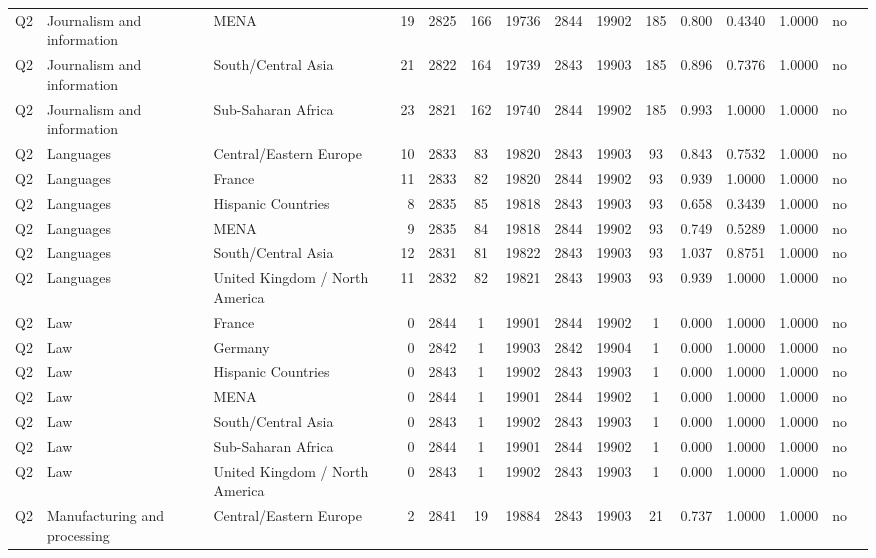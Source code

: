 \begin{longtable}{lllrcccccccccll}
Q2 & Journalism and information & MENA & 19 & 2825 & 166 & 19736 & 2844 & 19902 & 185 & 0.800 & 0.4340 & 1.0000 & no \\
Q2 & Journalism and information & South/Central Asia & 21 & 2822 & 164 & 19739 & 2843 & 19903 & 185 & 0.896 & 0.7376 & 1.0000 & no \\
Q2 & Journalism and information & Sub-Saharan Africa & 23 & 2821 & 162 & 19740 & 2844 & 19902 & 185 & 0.993 & 1.0000 & 1.0000 & no \\
Q2 & Languages & Central/Eastern Europe & 10 & 2833 & 83 & 19820 & 2843 & 19903 & 93 & 0.843 & 0.7532 & 1.0000 & no \\
Q2 & Languages & France & 11 & 2833 & 82 & 19820 & 2844 & 19902 & 93 & 0.939 & 1.0000 & 1.0000 & no \\
Q2 & Languages & Hispanic Countries & 8 & 2835 & 85 & 19818 & 2843 & 19903 & 93 & 0.658 & 0.3439 & 1.0000 & no \\
Q2 & Languages & MENA & 9 & 2835 & 84 & 19818 & 2844 & 19902 & 93 & 0.749 & 0.5289 & 1.0000 & no \\
Q2 & Languages & South/Central Asia & 12 & 2831 & 81 & 19822 & 2843 & 19903 & 93 & 1.037 & 0.8751 & 1.0000 & no \\
Q2 & Languages & United Kingdom / North America & 11 & 2832 & 82 & 19821 & 2843 & 19903 & 93 & 0.939 & 1.0000 & 1.0000 & no \\
Q2 & Law & France & 0 & 2844 & 1 & 19901 & 2844 & 19902 & 1 & 0.000 & 1.0000 & 1.0000 & no \\
Q2 & Law & Germany & 0 & 2842 & 1 & 19903 & 2842 & 19904 & 1 & 0.000 & 1.0000 & 1.0000 & no \\
Q2 & Law & Hispanic Countries & 0 & 2843 & 1 & 19902 & 2843 & 19903 & 1 & 0.000 & 1.0000 & 1.0000 & no \\
Q2 & Law & MENA & 0 & 2844 & 1 & 19901 & 2844 & 19902 & 1 & 0.000 & 1.0000 & 1.0000 & no \\
Q2 & Law & South/Central Asia & 0 & 2843 & 1 & 19902 & 2843 & 19903 & 1 & 0.000 & 1.0000 & 1.0000 & no \\
Q2 & Law & Sub-Saharan Africa & 0 & 2844 & 1 & 19901 & 2844 & 19902 & 1 & 0.000 & 1.0000 & 1.0000 & no \\
Q2 & Law & United Kingdom / North America & 0 & 2843 & 1 & 19902 & 2843 & 19903 & 1 & 0.000 & 1.0000 & 1.0000 & no \\
Q2 & Manufacturing and processing & Central/Eastern Europe & 2 & 2841 & 19 & 19884 & 2843 & 19903 & 21 & 0.737 & 1.0000 & 1.0000 & no \\

\end{longtable}
